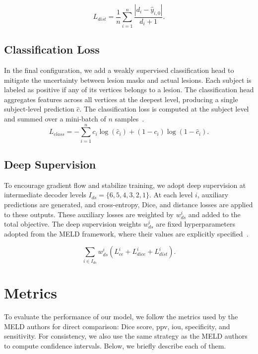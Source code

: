 \documentclass[FCD_GNN.tex]{subfiles}
\begin{document}
\begin{equation}
L_{dist} = \frac{1}{n} \sum_{i=1}^{n} \frac{|d_i - \hat{y}_{i,0}|}{d_i + 1}.
\end{equation}

\subsection*{Classification Loss}
In the final configuration, we add a weakly supervised classification head to
mitigate the uncertainty between lesion masks and actual lesions.
Each subject is labeled as positive if any of its vertices belongs to a lesion.
The classification head aggregates features across all vertices at the deepest
level, producing a single subject-level prediction $\hat{c}$.
The classification loss is computed at the subject level and summed over a
mini-batch of $n$ samples~\cite{Ripart2025MELD}.
\begin{equation}
L_{class} = - \sum_{i=1}^{n} c_i \log(\hat{c}_i) + (1-c_i)\log(1-\hat{c}_i).
\end{equation}

\subsection*{Deep Supervision}
To encourage gradient flow and stabilize training, we adopt deep supervision at
intermediate decoder levels $I_{ds} = \{6,5,4,3,2,1\}$.
At each level $i$, auxiliary predictions are generated, and cross-entropy, Dice,
and distance losses are applied to these outputs.
These auxiliary losses are weighted by $w^i_{ds}$ and added to the total
objective. The deep supervision weights $w_{ds}^i$ are fixed hyperparameters adopted from
the MELD framework, where their values are explicitly specified~\cite{Ripart2025MELD}.

\begin{equation}
\sum_{i \in I_{ds}} w^i_{ds}(L^i_{ce} + L^i_{dice} + L^i_{dist}).
\end{equation}


\section{Metrics}
To evaluate the performance of our model, we follow the metrics used by the MELD 
authors for direct comparison: Dice score, \ac{ppv}, \ac{iou}, specificity, 
and sensitivity. 
For consistency, we also use the same strategy as the MELD authors to compute confidence intervals.
Below, we briefly describe each of them.
\end{document}

